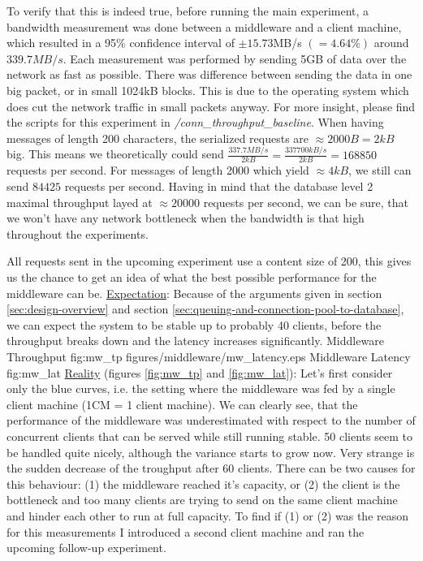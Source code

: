 \documentclass[11pt]{article}
\begin{document}
To verify that this is indeed true, before running the main experiment, a bandwidth measurement was done between a middleware and a client machine, which resulted in a 95\% confidence interval of $\pm15.73$MB/s $(=4.64\%)$ around $339.7MB/s$. Each measurement was performed by sending 5GB of data over the network as fast as possible. There was difference between sending the data in one big packet, or in small 1024kB blocks. This is due to the operating system which does cut the network traffic in small packets anyway. For more insight, please find the scripts for this experiment in \textit{/conn\_throughput\_baseline}. When having messages of length 200 characters, the serialized requests are $\approx2000B=2kB$ big. This means we theoretically could send $\frac{337.7MB/s}{2kB}=\frac{337700kB/s}{2kB}=168850$ requests per second. For messages of length 2000 which yield $\approx4kB$, we still can send $84425$ requests per second. Having in mind that the database level 2 maximal throughput layed at $\approx20000$ requests per second, we can be sure, that we won't have any network bottleneck when the bandwidth is that high throughout the experiments.

All requests sent in the upcoming experiment use a content size of 200, this gives us the chance to get an idea of what the best possible performance for the middleware can be.
\newline\underline{Expectation}: Because of the arguments given in section \ref{sec:design-overview} and section \ref{sec:queuing-and-connection-pool-to-database}, we can expect the system to be stable up to probably 40 clients, before the throughput breaks down and the latency increases significantly.
 {Middleware Throughput} {fig:mw_tp}
{figures/middleware/mw_latency.eps} {Middleware Latency} {fig:mw_lat}
\newline\underline{Reality} (figures \ref{fig:mw_tp} and \ref{fig:mw_lat}): Let's first consider only the blue curves, i.e. the setting where the middleware was fed by a single client machine  (1CM = 1 client machine). We can clearly see, that the performance of the middleware was underestimated with respect to the number of concurrent clients that can be served while still running stable. 50 clients seem to be handled quite nicely, although the variance starts to grow now. Very strange is the sudden decrease of the troughput after 60 clients. There can be two causes for this behaviour: (1) the middleware reached it's capacity, or (2) the client is the bottleneck and too many clients are trying to send on the same client machine and hinder each other to run at full capacity. To find if (1) or (2) was the reason for this measurements I introduced a second client machine and ran the upcoming follow-up experiment.
\end{document}
